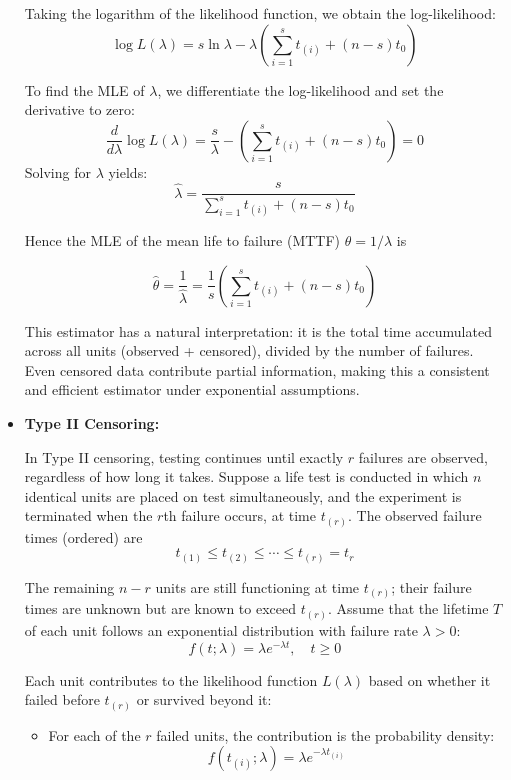 \documentclass[twoside]{book}
\begin{document}
\begin{itemize}
    Taking the logarithm of the likelihood function, we obtain the log-likelihood:
    \[
    \log L(\lambda)
    = s \ln \lambda - \lambda \left( \sum_{i=1}^s t_{(i)} + (n - s)t_0 \right)
    \]

    To find the MLE of $\lambda$, we differentiate the log-likelihood and set the derivative to zero:
    \[
    \frac{d}{d\lambda} \log L(\lambda)
    = \frac{s}{\lambda} - \left( \sum_{i=1}^s t_{(i)} + (n - s)t_0 \right) = 0
    \]
    Solving for $\lambda$ yields:
    \[
    \hat{\lambda}
    = \frac{s}{\displaystyle \sum_{i=1}^s t_{(i)} + (n - s)t_0}
    \]

    Hence the MLE of the mean life to failure (MTTF) \(\theta=1/\lambda\) is
    \begin{textbox}
    \[
    \hat{\theta}
    = \frac{1}{\hat{\lambda}}
    = \frac{1}{s} \left( \sum_{i=1}^s t_{(i)} + (n - s)t_0 \right)
    \]
    \end{textbox}


    This estimator has a natural interpretation: it is the total time accumulated across all units (observed + censored), divided by the number of failures. Even censored data contribute partial information, making this a consistent and efficient estimator under exponential assumptions.


    \bigskip

  \item \textbf{Type II Censoring:}

    \medskip

    In Type II censoring, testing continues until exactly $r$ failures are observed, regardless of how long it takes. Suppose a life test is conducted in which $n$ identical units are placed on test simultaneously, and the experiment is terminated when the $r$th failure occurs, at time $t_{(r)}$. The observed failure times (ordered) are
    \[
    t_{(1)} \le t_{(2)} \le \cdots \le t_{(r)} = t_r
    \]

    The remaining $n - r$ units are still functioning at time $t_{(r)}$; their failure times are unknown but are known to exceed $t_{(r)}$. Assume that the lifetime $T$ of each unit follows an exponential distribution with failure rate $\lambda > 0$:
    \[
    f(t; \lambda) = \lambda e^{-\lambda t}, \quad t \ge 0
    \]

    Each unit contributes to the likelihood function $L(\lambda)$ based on whether it failed before $t_{(r)}$ or survived beyond it:

    \begin{itemize}
      \item For each of the $r$ failed units, the contribution is the probability density:
      \[
      f(t_{(i)}; \lambda) = \lambda e^{-\lambda t_{(i)}}
      \]


\end{itemize}
\end{itemize}
\end{document}
